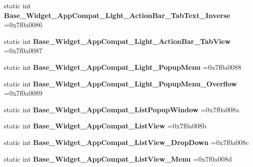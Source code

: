 \begin{DoxyCompactItemize}
static int {\bfseries Base\+\_\+\+Widget\+\_\+\+App\+Compat\+\_\+\+Light\+\_\+\+Action\+Bar\+\_\+\+Tab\+Text\+\_\+\+Inverse} =0x7f0a0086
\item 
\mbox{\label{classandroid_1_1support_1_1v7_1_1appcompat_1_1R_1_1style_a7259039825ec9272587224627c782f20}} 
static int {\bfseries Base\+\_\+\+Widget\+\_\+\+App\+Compat\+\_\+\+Light\+\_\+\+Action\+Bar\+\_\+\+Tab\+View} =0x7f0a0087
\item 
\mbox{\label{classandroid_1_1support_1_1v7_1_1appcompat_1_1R_1_1style_ad3df4912226525d3e17159f28298ef5d}} 
static int {\bfseries Base\+\_\+\+Widget\+\_\+\+App\+Compat\+\_\+\+Light\+\_\+\+Popup\+Menu} =0x7f0a0088
\item 
\mbox{\label{classandroid_1_1support_1_1v7_1_1appcompat_1_1R_1_1style_aa76e4fb6e7d6c140f98e562b3377fc3e}} 
static int {\bfseries Base\+\_\+\+Widget\+\_\+\+App\+Compat\+\_\+\+Light\+\_\+\+Popup\+Menu\+\_\+\+Overflow} =0x7f0a0089
\item 
\mbox{\label{classandroid_1_1support_1_1v7_1_1appcompat_1_1R_1_1style_a614ce2e52cdc41b36605151a1f26a750}} 
static int {\bfseries Base\+\_\+\+Widget\+\_\+\+App\+Compat\+\_\+\+List\+Popup\+Window} =0x7f0a008a
\item 
\mbox{\label{classandroid_1_1support_1_1v7_1_1appcompat_1_1R_1_1style_a8492f6e7f598d35fb75288d2967ac5f3}} 
static int {\bfseries Base\+\_\+\+Widget\+\_\+\+App\+Compat\+\_\+\+List\+View} =0x7f0a008b
\item 
\mbox{\label{classandroid_1_1support_1_1v7_1_1appcompat_1_1R_1_1style_a3b9ce2cd4fda5da76089c02b55776ee7}} 
static int {\bfseries Base\+\_\+\+Widget\+\_\+\+App\+Compat\+\_\+\+List\+View\+\_\+\+Drop\+Down} =0x7f0a008c
\item 
\mbox{\label{classandroid_1_1support_1_1v7_1_1appcompat_1_1R_1_1style_a6a7bb6ff57f27f50fc2659be79c20a9f}} 
static int {\bfseries Base\+\_\+\+Widget\+\_\+\+App\+Compat\+\_\+\+List\+View\+\_\+\+Menu} =0x7f0a008d

\end{DoxyCompactItemize}
